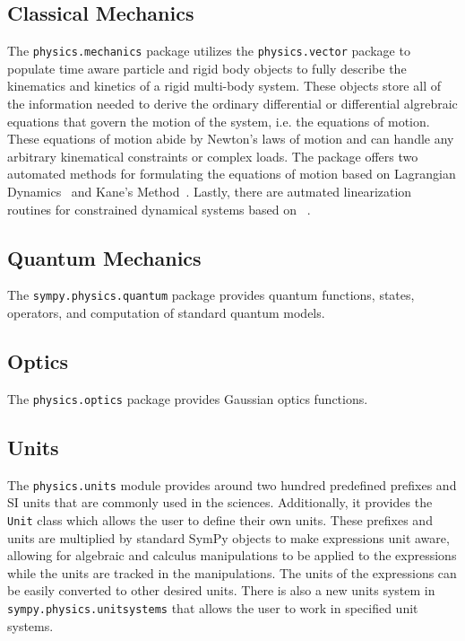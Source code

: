 \subsection{Classical Mechanics}

The \verb|physics.mechanics| package utilizes the \verb|physics.vector| package
to populate time aware particle and rigid body objects to fully describe the
kinematics and kinetics of a rigid multi-body system. These objects store all
of the information needed to derive the ordinary differential or differential
algrebraic equations that govern the motion of the system, i.e. the equations
of motion. These equations of motion abide by Newton's laws of motion and can
handle any arbitrary kinematical constraints or complex loads. The package
offers two automated methods for formulating the equations of motion based on
Lagrangian Dynamics~\cite{XXX} and Kane's Method~\cite{Kane1985}. Lastly, there
are autmated linearization routines for constrained dynamical
systems based on ~\cite{Peterson2015}.

\subsection{Quantum Mechanics}

The \verb|sympy.physics.quantum| package provides quantum functions, states,
operators, and computation of standard quantum models.


\subsection{Optics}

The \verb|physics.optics| package provides Gaussian optics functions.


\subsection{Units}

The \verb|physics.units| module provides around two hundred predefined prefixes
and SI units that are commonly used in the sciences. Additionally, it provides
the \verb|Unit| class which allows the user to define their own units.  These
prefixes and units are multiplied by standard SymPy objects to make expressions
unit aware, allowing for algebraic and calculus manipulations to be applied to
the expressions while the units are tracked in the manipulations.  The units of
the expressions can be easily converted to other desired units.  There is also
a new units system in \verb|sympy.physics.unitsystems| that allows the user to
work in specified unit systems.
